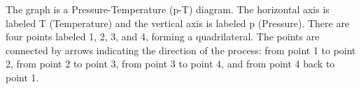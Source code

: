 The graph is a Pressure-Temperature (p-T) diagram. The horizontal axis is labeled T (Temperature) and the vertical axis is labeled p (Pressure). There are four points labeled 1, 2, 3, and 4, forming a quadrilateral. The points are connected by arrows indicating the direction of the process: from point 1 to point 2, from point 2 to point 3, from point 3 to point 4, and from point 4 back to point 1.